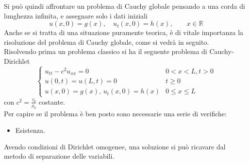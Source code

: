 \documentclass[a4paper,12pt, draft]{article}
\theoremstyle{break}
\numberwithin{equation}{section}
\begin{document}
Si può quindi affrontare un problema di Cauchy globale pensando a una corda di lunghezza infinita, e assegnare solo i dati iniziali
\[
  u(x,0) = g(x), \quad u_t(x,0) = h(x), \qquad x \in \mathbb{R}
\]
Anche se si tratta di una situazione puramente teorica, è di vitale importanza la risoluzione del problema di Cauchy globale, come si vedrà in seguito. \\
Risolvendo prima un problema classico si ha il seguente problema di Cauchy-Dirichlet
\begin{equation}
  \begin{cases}
    u_{tt} - c^2u_{xx} = 0 & 0 < x < L, t > 0 \\
    u(0,t) = u(L,t) = 0 & t \geq 0 \\
    u(x,0) = g(x), \, u_t(x,0)=h(x) & 0 \leq x \leq L
  \end{cases}
\end{equation}
con \(c^2 = \frac{\tau_0}{\rho_0}\) costante. \\
Per capire se il problema è ben posto sono necessarie una serie di verifiche:
\begin{itemize}
  \item Esistenza. 
\end{itemize}
Avendo condizioni di Dirichlet omogenee, una soluzione si può ricavare dal metodo di separazione delle variabili. 
\end{document}

